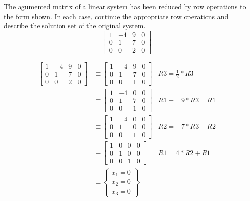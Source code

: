 \documentclass{mathhomework}
\begin{document}
\begin{problem}[1.1\#8]
    The agumented matrix of a linear system has been reduced by row operations to the form shown.
    In each case, continue the appropriate row operations and describe the solution set of the original system.
    $$\begin{bmatrix}
        1 & -4 & 9 & 0 \\
        0 & 1 & 7 & 0 \\
        0 & 0 & 2 & 0
    \end{bmatrix}$$

    \begin{solution}
        \begin{align*}
                    \begin{bmatrix}
                        1 & -4 & 9 & 0 \\
                        0 & 1 & 7 & 0 \\
                        0 & 0 & 2 & 0
                    \end{bmatrix}
                    & \equiv
                    \begin{bmatrix}
                        1 & -4 & 9 & 0 \\
                        0 & 1 & 7 & 0 \\
                        0 & 0 & 1 & 0
                    \end{bmatrix}
                    & R3 = \frac{1}{2} * R3 \\ & \equiv
                    \begin{bmatrix}
                        1 & -4 & 0 & 0 \\
                        0 & 1 & 7 & 0 \\
                        0 & 0 & 1 & 0
                    \end{bmatrix}
                    & R1 = -9 * R3 + R1 \\ & \equiv
                    \begin{bmatrix}
                        1 & -4 & 0 & 0 \\
                        0 & 1 & 0 & 0 \\
                        0 & 0 & 1 & 0
                    \end{bmatrix}
                    & R2 = -7 * R3 + R2\\ & \equiv
                    \begin{bmatrix}
                        1 & 0 & 0 & 0 \\
                        0 & 1 & 0 & 0 \\
                        0 & 0 & 1 & 0
                    \end{bmatrix}
                    & R1 = 4 * R2 + R1 \\ & \equiv
                    \begin{Bmatrix}
                        x_1 = 0 \\
                        x_2 = 0 \\
                        x_3 = 0
                    \end{Bmatrix}
                \end{align*}    
                

\end{solution}
\end{problem}
\end{document}

